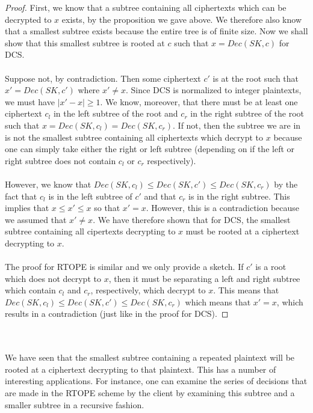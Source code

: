 \documentclass[12pt]{article}
\begin{document}
\begin{proof}
  First, we know that a subtree containing all ciphertexts which can be decrypted to $x$ exists, by the proposition we gave above. We therefore also know that a smallest subtree exists because the entire tree is of finite size. Now we shall show that this smallest subtree is rooted at $c$ such that $x = Dec(SK, c)$ for DCS. \\ \\
Suppose not, by contradiction. Then some ciphertext $c'$ is at the root such that $x' = Dec(SK, c')$ where $x' \neq x$. Since DCS is normalized to integer plaintexts, we must have $|x' - x| \geq 1$. We know, moreover, that there must be at least one ciphertext $c_l$ in the left subtree of the root and $c_r$ in the right subtree of the root such that $x = Dec(SK, c_l) = Dec(SK, c_r)$. If not, then the subtree we are in is not the smallest subtree containing all ciphertexts which decrypt to $x$ because one can simply take either the right or left subtree (depending on if the left or right subtree does not contain $c_l$ or $c_r$ respectively). \\ \\
However, we know that $Dec(SK, c_l) \leq Dec(SK, c') \leq Dec(SK, c_r)$ by the fact that $c_l$ is in the left subtree of $c'$ and that $c_r$ is in the right subtree. This implies that $x \leq x' \leq x$ so that $x' = x$. However, this is a contradiction because we assumed that $x' \neq x$. We have therefore shown that for DCS, the smallest subtree containing all cipertexts decrypting to $x$ must be rooted at a ciphertext decrypting to $x$. \\ \\
The proof for RTOPE is similar and we only provide a sketch. If $c'$ is a root which does not decrypt to $x$, then it must be separating a left and right subtree which contain $c_l$ and $c_r$, respectively, which decrypt to $x$. This means that $Dec(SK, c_l) \leq Dec(SK, c') \leq Dec(SK, c_r)$ which means that $x' = x$, which results in a contradiction (just like in the proof for DCS).
\end{proof} \\ \\
We have seen that the smallest subtree containing a repeated plaintext will be rooted at a ciphertext decrypting to that plaintext. This has a number of interesting applications. For instance, one can examine the series of decisions that are made in the RTOPE scheme by the client by examining this subtree and a smaller subtree in a recursive fashion. \\ \\
\end{document}
